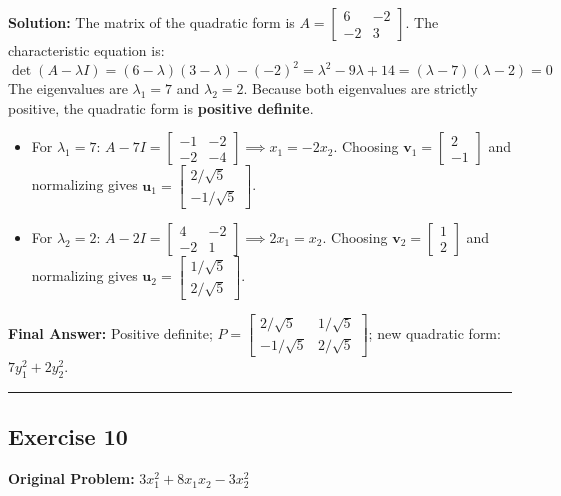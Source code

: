 \documentclass[11pt, letterpaper]{article}
\theoremstyle{definition}
\theoremstyle{remark}
\begin{document}
\textbf{Solution:}
The matrix of the quadratic form is $A = \begin{bmatrix} 6 & -2 \\ -2 & 3 \end{bmatrix}$.
The characteristic equation is:
\[
\det(A - \lambda I) = (6 - \lambda)(3 - \lambda) - (-2)^2 = \lambda^2 - 9\lambda + 14 = (\lambda - 7)(\lambda - 2) = 0
\]
The eigenvalues are $\lambda_1 = 7$ and $\lambda_2 = 2$. Because both eigenvalues are strictly positive, the quadratic form is \textbf{positive definite}.
\begin{itemize}
    \item For $\lambda_1 = 7$: $A - 7I = \begin{bmatrix} -1 & -2 \\ -2 & -4 \end{bmatrix} \implies x_1 = -2x_2$. Choosing $\mathbf{v}_1 = \begin{bmatrix} 2 \\ -1 \end{bmatrix}$ and normalizing gives $\mathbf{u}_1 = \begin{bmatrix} 2/\sqrt{5} \\ -1/\sqrt{5} \end{bmatrix}$.
    \item For $\lambda_2 = 2$: $A - 2I = \begin{bmatrix} 4 & -2 \\ -2 & 1 \end{bmatrix} \implies 2x_1 = x_2$. Choosing $\mathbf{v}_2 = \begin{bmatrix} 1 \\ 2 \end{bmatrix}$ and normalizing gives $\mathbf{u}_2 = \begin{bmatrix} 1/\sqrt{5} \\ 2/\sqrt{5} \end{bmatrix}$.
\end{itemize}
\textbf{Final Answer:} Positive definite; $P = \begin{bmatrix} 2/\sqrt{5} & 1/\sqrt{5} \\ -1/\sqrt{5} & 2/\sqrt{5} \end{bmatrix}$; new quadratic form: $7y_1^2 + 2y_2^2$.

\medskip\hrule\medskip

\subsection*{Exercise 10}
\textbf{Original Problem:} $3x_1^2 + 8x_1x_2 - 3x_2^2$
\end{document}
